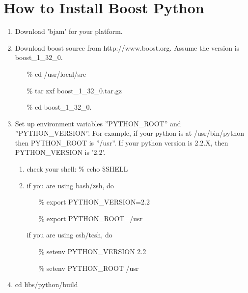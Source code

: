%


\section{How to Install Boost Python}
\label{HELP-OPT-PROG-INST}
  \begin{enumerate}
    \item
      Download 'bjam' for your platform.
    \item
      Download boost source from http://www.boost.org. Assume the
      version is boost\_1\_32\_0.
      \color[named]{Blue}
      \begin{itemize} 
        \item[\%] cd /usr/local/src
	\item[\%] tar zxf boost\_1\_32\_0.tar.gz
	\item[\%] cd boost\_1\_32\_0.
      \end{itemize}
      \normalcolor

    \item
      Set up environment variables ''PYTHON\_ROOT'' and ''PYTHON\_VERSION''.
       For example, if your python is at /usr/bin/python then PYTHON\_ROOT is
       ''/usr''. If your python version is 2.2.X, then PYTHON\_VERSION
       is '2.2'.
       \begin{enumerate}
       \item 
	 check your shell: {\color[named]{Blue}\% echo \$SHELL}
       
       \item
	 if you are using bash/zsh, do
	 \color[named]{Blue}
	 \begin{itemize}
           \item[\%] export PYTHON\_VERSION=2.2
           \item[\%] export PYTHON\_ROOT=/usr
	 \end{itemize}
	 \normalcolor

          if you are using csh/tcsh, do
	  \color[named]{Blue}
	  \begin{itemize}
            \item[\%] setenv PYTHON\_VERSION 2.2
            \item[\%] setenv PYTHON\_ROOT /usr
	  \end{itemize}
	  \normalcolor
       \end{enumerate}

     \item
	  {\color[named]{Blue} cd libs/python/build}
    

\end{enumerate}

